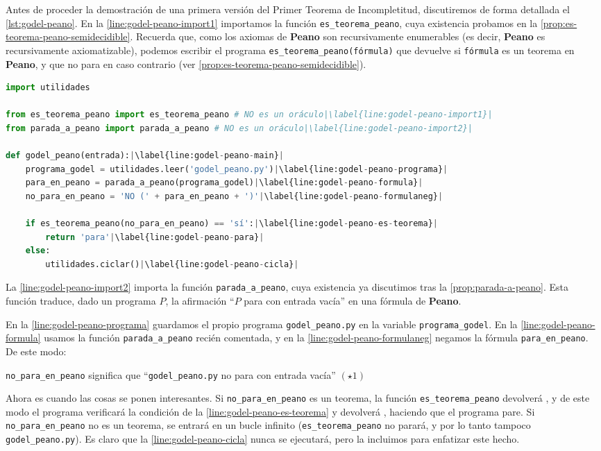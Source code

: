 Antes de proceder la demostración de una primera versión del Primer Teorema de Incompletitud, discutiremos de forma detallada el \cref{lst:godel-peano}. En la \cref{line:godel-peano-import1} importamos la función \texttt{es\_teorema\_peano}, cuya existencia probamos en la \cref{prop:es-teorema-peano-semidecidible}. Recuerda que, como los axiomas de \textbf{Peano} son recursivamente enumerables (es decir, \textbf{Peano} es recursivamente axiomatizable), podemos escribir el programa \texttt{es\_teorema\_peano(fórmula)} que devuelve  si \texttt{fórmula} es un teorema en \textbf{Peano}, y que no para en caso contrario (ver \cref{prop:es-teorema-peano-semidecidible}).
\vspace{8pt}
\begin{lstlisting}[language=Python, caption=\lstinline{godel_peano.py},label={lst:godel-peano}]
import utilidades

from es_teorema_peano import es_teorema_peano # NO es un oráculo|\label{line:godel-peano-import1}|
from parada_a_peano import parada_a_peano # NO es un oráculo|\label{line:godel-peano-import2}|

def godel_peano(entrada):|\label{line:godel-peano-main}|
    programa_godel = utilidades.leer('godel_peano.py')|\label{line:godel-peano-programa}|
    para_en_peano = parada_a_peano(programa_godel)|\label{line:godel-peano-formula}|
    no_para_en_peano = 'NO (' + para_en_peano + ')'|\label{line:godel-peano-formulaneg}|

    if es_teorema_peano(no_para_en_peano) == 'sí':|\label{line:godel-peano-es-teorema}|
        return 'para'|\label{line:godel-peano-para}|
    else:
        utilidades.ciclar()|\label{line:godel-peano-cicla}|
\end{lstlisting}

La \cref{line:godel-peano-import2} importa la función \texttt{parada\_a\_peano}, cuya existencia ya discutimos tras la \cref{prop:parada-a-peano}. Esta función traduce, dado un programa $P$, la afirmación ``$P$ para con entrada vacía'' en una fórmula de \textbf{Peano}.

En la \cref{line:godel-peano-programa} guardamos el propio programa \texttt{godel\_peano.py} en la variable \texttt{programa\_godel}. En la \cref{line:godel-peano-formula} usamos la función \texttt{parada\_a\_peano} recién comentada, y en la \cref{line:godel-peano-formulaneg} negamos la fórmula \texttt{para\_en\_peano}. De este modo:
\begin{adjustwidth}{30pt}{}
    \texttt{no\_para\_en\_peano} significa que ``\texttt{godel\_peano.py} no para con entrada vacía'' \hfill $(\star1)$
\end{adjustwidth}
Ahora es cuando las cosas se ponen interesantes. Si \texttt{no\_para\_en\_peano} es un teorema, la función \texttt{es\_teorema\_peano} devolverá , y de este modo el programa verificará la condición de la \cref{line:godel-peano-es-teorema} y devolverá , haciendo que el programa pare. Si \texttt{no\_para\_en\_peano} no es un teorema, se entrará en un bucle infinito (\texttt{es\_teorema\_peano} no parará, y por lo tanto tampoco \texttt{godel\_peano.py}). Es claro que la \cref{line:godel-peano-cicla} nunca se ejecutará, pero la incluimos para enfatizar este hecho.

